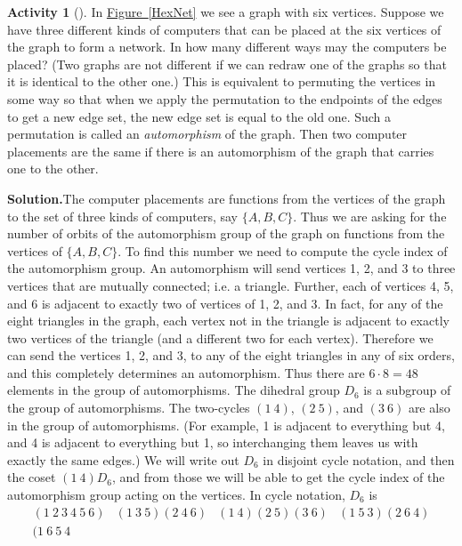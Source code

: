 \documentclass[10pt,]{book}
\theoremstyle{plain}
\theoremstyle{definition}
\newtheorem{activity}[project]{Activity}
\numberwithin{equation}{chapter}
\newcommand{\amp}{&}
\begin{document}
\begin{activity}[]\label{activity-318}
In \hyperref[HexNet]{Figure~\ref{HexNet}} we see a graph with six vertices. Suppose we have three different kinds of computers that can be placed at the six vertices of the graph to form a network. In how many different ways may the computers be placed? (Two graphs are not different if we can redraw one of the graphs so that it is identical to the other one.) This is equivalent to permuting the vertices in some way so that when we apply the permutation to the endpoints of the edges to get a new edge set, the new edge set is equal to the old one. Such a permutation is called an \emph{automorphism} of the graph. Then two computer placements are the same if there is an automorphism of the graph that carries one to the other.%
\par\medskip\noindent%
\textbf{Solution.}\quad The computer placements are functions from the vertices of the graph to the set of three kinds of computers, say \(\{A,B,C\}\). Thus we are asking for the number of orbits of the automorphism group of the graph on functions from the vertices of \(\{A, B,
C\}\). To find this number we need to compute the cycle index of the automorphism group. An automorphism will send vertices 1, 2, and 3 to three vertices that are mutually connected; i.e. a triangle. Further, each of vertices 4, 5, and 6 is adjacent to exactly two of vertices of 1, 2, and 3. In fact, for any of the eight triangles in the graph, each vertex not in the triangle is adjacent to exactly two vertices of the triangle (and a different two for each vertex). Therefore we can send the vertices 1, 2, and 3, to any of the eight triangles in any of six orders, and this completely determines an automorphism. Thus there are \(6\cdot8=48\) elements in the group of automorphisms. The dihedral group \(D_6\) is a subgroup of the group of automorphisms. The two-cycles \((1\ 4)\), \((2\ 5)\), and \((3\ 6)\) are also in the group of automorphisms. (For example, 1 is adjacent to everything but 4, and 4 is adjacent to everything but 1, so interchanging them leaves us with exactly the same edges.) We will write out \(D_6\) in disjoint cycle notation, and then the coset \((1\ 4)D_6\), and from those we will be able to get the cycle index of the automorphism group acting on the vertices. In cycle notation, \(D_6\) is%
\begin{equation*}
\begin{array}{cccc}
(1\ 2\ 3\ 4\ 5\ 6)\amp (1\ 3\ 5)(2\ 4\ 6)\amp (1\ 4)(2\ 5)(3 \ 6)\amp  (1\ 5\ 3)(2\ 6\ 4)\\(1\ 6\ 5\ 4\

\end{array}
\end{equation*}
\end{activity}
\end{document}
